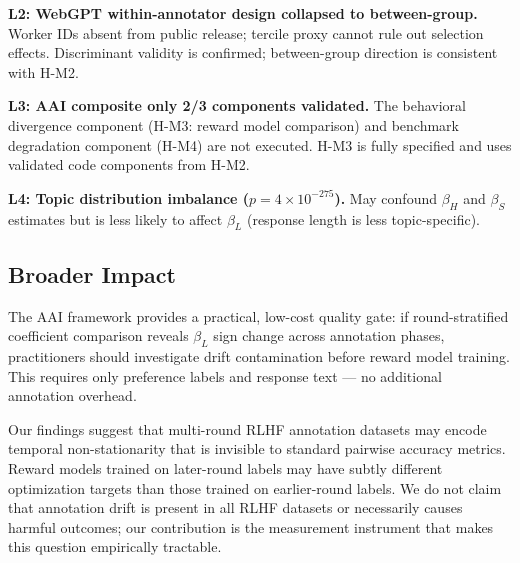 \textbf{L2: WebGPT within-annotator design collapsed to between-group.} Worker IDs absent from public release; tercile proxy cannot rule out selection effects. Discriminant validity is confirmed; between-group direction is consistent with H-M2.

\textbf{L3: AAI composite only 2/3 components validated.} The behavioral divergence component (H-M3: reward model comparison) and benchmark degradation component (H-M4) are not executed. H-M3 is fully specified and uses validated code components from H-M2.

\textbf{L4: Topic distribution imbalance ($p = 4\times10^{-275}$).} May confound $\beta_H$ and $\beta_S$ estimates but is less likely to affect $\beta_L$ (response length is less topic-specific).

\subsection{Broader Impact}

The AAI framework provides a practical, low-cost quality gate: if round-stratified coefficient comparison reveals $\beta_L$ sign change across annotation phases, practitioners should investigate drift contamination before reward model training. This requires only preference labels and response text --- no additional annotation overhead.

Our findings suggest that multi-round RLHF annotation datasets may encode temporal non-stationarity that is invisible to standard pairwise accuracy metrics. Reward models trained on later-round labels may have subtly different optimization targets than those trained on earlier-round labels. We do not claim that annotation drift is present in all RLHF datasets or necessarily causes harmful outcomes; our contribution is the measurement instrument that makes this question empirically tractable.
